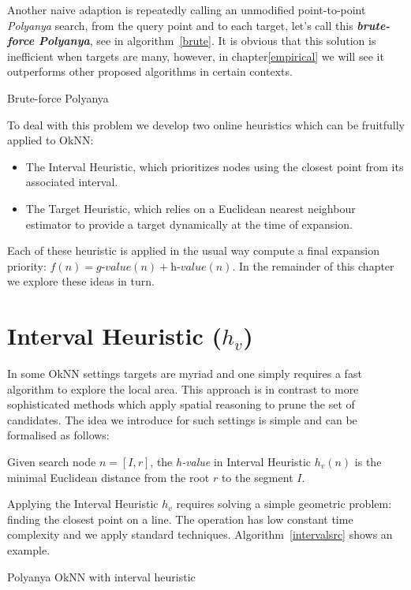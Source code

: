 Another naive adaption is repeatedly calling an unmodified point-to-point \textit{Polyanya}
search, from the query point and to each target, let's call this \textbf{\textit{brute-force
Polyanya}}, see in algorithm~\ref{brute}. It is obvious that this solution is
inefficient when targets are many, however, in chapter\ref{empirical} we will see it
outperforms other proposed algorithms in certain contexts. 
\begin{algorithm}[!htp]
  
  \caption{Brute-force Polyanya}
  \label{brute}
\end{algorithm}
To deal with this problem we develop two online heuristics which can be fruitfully applied to OkNN:
\begin{itemize}
  \item The Interval Heuristic, which prioritizes nodes using the closest point from its
    associated interval.
  \item The Target Heuristic, which relies on a Euclidean nearest neighbour estimator to
    provide a target dynamically at the time of expansion.
\end{itemize}
Each of these heuristic is applied in the usual way compute a final expansion priority: 
$f(n) = \textit{g-value}(n) + \textit{h-value}(n)$. In the remainder of this chapter we explore
these ideas in turn.

\section{Interval Heuristic ($h_v$)}\label{intervalh}
In some OkNN settings targets are myriad and one simply requires a fast algorithm to explore
the local area. This approach is in contrast to more sophisticated methods which apply spatial
reasoning to prune the set of candidates. The idea we introduce for such settings is simple and
can be formalised as follows:

\begin{definition}
  Given search node $n=[I, r]$, the \textit{h-value} in Interval Heuristic $h_v(n)$ 
  is the minimal Euclidean distance from the root $r$ to the segment $I$.
\end{definition}

Applying the Interval Heuristic $h_v$ requires solving a simple geometric problem: finding the
closest point on a line. The operation has low constant time complexity and we apply
standard techniques. Algorithm~\ref{intervalsrc} shows an example.

\begin{algorithm}[!htb]
  
  \caption{Polyanya OkNN with interval heuristic}
  \label{intervalsrc}
\end{algorithm}

